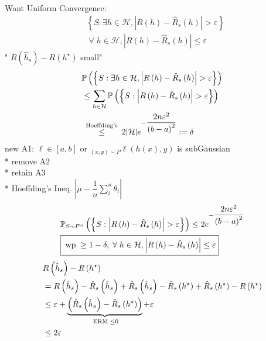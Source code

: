 \documentclass{article}
\begin{document}
Want Uniform Convergence:
\begin{align*}
&  \left\{S : \exists h \in \mathcal{H}, \left|  R\left(h\right) - \hat{R}_{s}\left(h\right)  \right| > \varepsilon\right\}
\\ &  \;\forall\; h \in \mathcal{H}, | R\left(h\right) - \hat{R}_{s}\left(h\right) | \leq  \varepsilon
\end{align*}
" $R\left(\hat{h}_{s}\right)  - R\left(h^\star \right)$ small"
\newline \newline
\begin{align*}
&  \mathbb{P}\left(\left\{S : \exists h \in \mathcal{H}, \left|  R\left(h\right) - \hat{R}_{s}\left(h\right)  \right| > \varepsilon\right\}\right)
\\ &\leq  \displaystyle\sum_{h \in \mathcal{H}} \mathbb{P}\left(\left\{S : \left|  R\left(h\right) - \hat{R}_{s}\left(h\right)  \right| > \varepsilon\right\}\right)
\\ &\stackrel{\text{\;Hoeffding's\;}}{\leq} 2 | \mathcal{H} | e^{- \dfrac{2 n \varepsilon^{2}}{\left(b - a\right)^{2}}} := \delta
\end{align*}
new A1: $\ell \in \left[a , b \right]$ or $_{\left(x, y\right) \sim  P} \ell\left(h\left(x\right), y\right)$ is subGaussian
\\* remove A2
\\* retain A3
\\* Hoeffding's Ineq. $\left|  \mu - \dfrac{1}{n} \displaystyle\sum_{i}^{n} \theta_{i}  \right|$
\begin{align*}
&  \mathbb{P}_{S \sim  P^{n}}\left(\left\{S: \left|  R\left(h\right) - \hat{R}_{s}\left(h\right)  \right| > \varepsilon\right\}\right) \leq  2 e^{- \dfrac{2 n \varepsilon^{2}}{\left(b - a\right)^{2}}}
\\ &  \boxed{\text{\;wp\;} \geq  1 - \delta, \;\forall\; h \in \mathcal{H}, \left|  R\left(h\right) - \hat{R}_{s}\left(h\right)  \right| \leq  \varepsilon}
\end{align*}
\begin{align*}
&  R\left(\hat{h}_{s}\right) - R\left(h^\star \right)
\\ &= R\left(\hat{h}_{s}\right) - \hat{R}_{s}\left(\hat{h}_{s}\right) + \hat{R}_{s}\left(\hat{h}_{s}\right) - \hat{R}_{s}\left(h^\star \right) + \hat{R}_{s}\left(h^\star \right) - R\left(h^\star \right)
\\ &\leq  \varepsilon + \underbrace{\left(\hat{R}_{s}\left(\hat{h}_{s}\right) - \hat{R}_{s}\left(h^\star \right)\right)}_{\text{\;ERM\;} \leq  0} + \varepsilon
\\ &\leq  2 \varepsilon
\end{align*}
\end{document}

